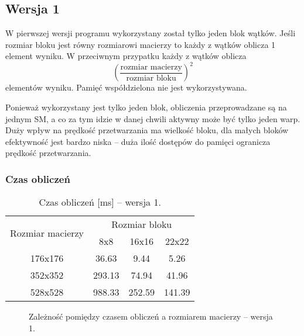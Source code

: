 
\subsection{Wersja 1}

W pierwszej wersji programu wykorzystany został tylko jeden blok wątków. Jeśli rozmiar bloku jest równy rozmiarowi macierzy to każdy z wątków oblicza 1 element wyniku. W przeciwnym przypatku każdy z wątków oblicza $$ {\left(\frac{\text{rozmiar macierzy}}{\text{rozmiar bloku}}\right)}^{2} $$ elementów wyniku. Pamięć współdzielona nie jest wykorzystywana.



Ponieważ wykorzystany jest tylko jeden blok, obliczenia przeprowadzane są na jednym SM, a co za tym idzie w danej chwili aktywny może być tylko jeden warp. \\
Duży wpływ na prędkość przetwarzania ma wielkość bloku, dla małych bloków efektywność jest bardzo niska -- duża ilość dostępów do pamięci ogranicza prędkość przetwarzania.

\subsubsection{Czas obliczeń}

\begin{table}[H]
\centering
\begin{tabular}{|c|c|c|c|}
\hline
\multirow{2}{*}{Rozmiar macierzy} & \multicolumn{3}{c|}{Rozmiar bloku} \\ \cline{2-4}
& 8x8 & 16x16 & 22x22 \\ \hline
176x176 & 36.63 & 9.44 & 5.26 \\ \hline
352x352 & 293.13 & 74.94 & 41.96 \\ \hline
528x528 & 988.33 & 252.59 & 141.39 \\ \hline
\end{tabular}
\caption{Czas obliczeń [ms] -- wersja 1.}
\end{table}

\begin{figure}[H]
\centering
\caption{Zależność pomiędzy czasem obliczeń a rozmiarem macierzy -- wersja 1.}
\end{figure}


